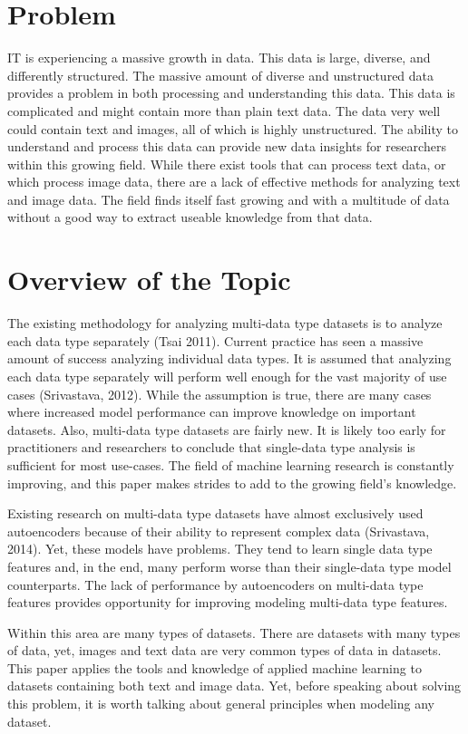 
\chapter{Problem}
IT is experiencing a massive growth in data.  This data is large, diverse, and differently structured.  The massive amount of diverse and unstructured data provides a problem in both processing and understanding this data.  This data is complicated and might contain more than plain text data.  The data very well could contain text and images, all of which is highly unstructured. The ability to understand and process this data can provide new data insights for researchers within this growing field. While there exist tools that can process text data, or which process image data, there are a lack of effective methods for analyzing text and image data.  The field finds itself fast growing and with a multitude of data without a good way to extract useable knowledge from that data. 

\chapter{Overview of the Topic}
The existing methodology for analyzing multi-data type datasets is to analyze each data type separately (Tsai 2011).  Current practice has seen a massive amount of success analyzing individual data types.  It is assumed that analyzing each data type separately will perform well enough for the vast majority of use cases (Srivastava, 2012).  While the assumption is true, there are many cases where increased model performance can improve knowledge on important datasets.  Also, multi-data type datasets are fairly new.  It is likely too early for practitioners and researchers to conclude that single-data type analysis is sufficient for most use-cases.  The field of machine learning research is constantly improving, and this paper makes strides to add to the growing field's knowledge.

Existing research on multi-data type datasets have almost exclusively used autoencoders because of their ability to represent complex data (Srivastava, 2014).  Yet, these models have problems.  They tend to learn single data type features and, in the end, many perform worse than their single-data type model counterparts.  The lack of performance by autoencoders on multi-data type features provides opportunity for improving modeling multi-data type features.

Within this area are many types of datasets.  There are datasets with many types of data, yet, images and text data are very common types of data in datasets.  This paper applies the tools and knowledge of applied machine learning to datasets containing both text and image data.  Yet, before speaking about solving this problem, it is worth talking about general principles when modeling any dataset.  

